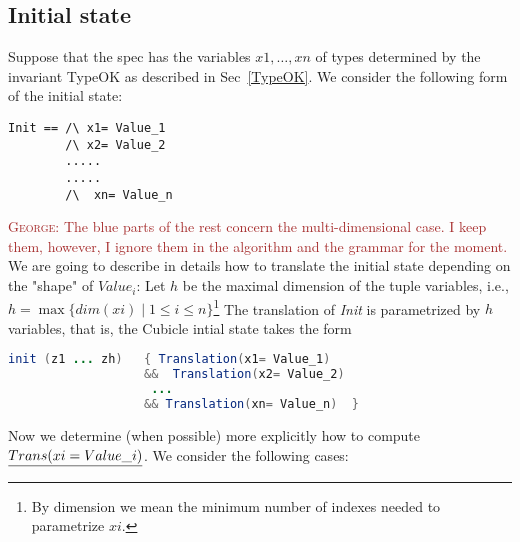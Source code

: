 \documentclass{article}
\theoremstyle{plain}
\numberwithin{equation}{section}
\newcommand{\george}[1]{\textcolor{brown}{\textsc{George: } {\sf #1}}}
\renewcommand{\leq}{\leqslant}
\begin{document}
\subsection{Initial state} 
Suppose that the spec has the variables $x1, \dots, xn$ of types determined by the invariant TypeOK as described in Sec~\ref{TypeOK}.  We consider the following form of the initial state:

\begin{lstlisting}
Init == /\ x1= Value_1  
        /\ x2= Value_2  
        .....
        .....
        /\  xn= Value_n   
\end{lstlisting}
\george{The blue parts of the rest concern the multi-dimensional case. I keep them, however, I ignore  them in the algorithm and the grammar for the moment.  }
\color{blue}
We are going to describe in details how to translate the initial state depending on the "shape" of $Value_i$: Let $h$ be the maximal dimension of the tuple variables, i.e., $h=\max\{dim(xi)\mid 1\leq i \leq n\}$\footnote{By dimension we mean the minimum number of indexes needed to parametrize $xi$.} The translation of \emph{Init}  is parametrized by $h$ variables, that is, the Cubicle intial state takes the form 
\begin{lstlisting}[language=java]
init (z1 ... zh)   { Translation(x1= Value_1) 
                   &&  Translation(x2= Value_2) 
                    ... 
                   && Translation(xn= Value_n)  }
\end{lstlisting} \color{black}
  Now we determine (when possible) more explicitly  how to compute  $\emph{Trans(xi= Value\_i)}$. We consider the following cases: 
\end{document}
